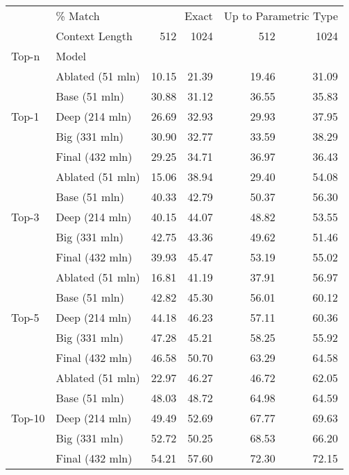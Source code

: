 \begin{tabular}{llrrrr}
\toprule
 & \% Match & \multicolumn{2}{r}{Exact} & \multicolumn{2}{r}{Up to Parametric Type} \\
 & Context Length & 512 & 1024 & 512 & 1024 \\
Top-n & Model &  &  &  &  \\
\midrule
\multirow[t]{5}{*}{Top-1} & Ablated (51 mln) & 10.15 & 21.39 & 19.46 & 31.09 \\
 & Base (51 mln) & 30.88 & 31.12 & 36.55 & 35.83 \\
 & Deep (214 mln) & 26.69 & 32.93 & 29.93 & 37.95 \\
 & Big (331 mln) & 30.90 & 32.77 & 33.59 & 38.29 \\
 & Final (432 mln) & 29.25 & 34.71 & 36.97 & 36.43 \\
\cline{1-6}
\multirow[t]{5}{*}{Top-3} & Ablated (51 mln) & 15.06 & 38.94 & 29.40 & 54.08 \\
 & Base (51 mln) & 40.33 & 42.79 & 50.37 & 56.30 \\
 & Deep (214 mln) & 40.15 & 44.07 & 48.82 & 53.55 \\
 & Big (331 mln) & 42.75 & 43.36 & 49.62 & 51.46 \\
 & Final (432 mln) & 39.93 & 45.47 & 53.19 & 55.02 \\
\cline{1-6}
\multirow[t]{5}{*}{Top-5} & Ablated (51 mln) & 16.81 & 41.19 & 37.91 & 56.97 \\
 & Base (51 mln) & 42.82 & 45.30 & 56.01 & 60.12 \\
 & Deep (214 mln) & 44.18 & 46.23 & 57.11 & 60.36 \\
 & Big (331 mln) & 47.28 & 45.21 & 58.25 & 55.92 \\
 & Final (432 mln) & 46.58 & 50.70 & 63.29 & 64.58 \\
\cline{1-6}
\multirow[t]{5}{*}{Top-10} & Ablated (51 mln) & 22.97 & 46.27 & 46.72 & 62.05 \\
 & Base (51 mln) & 48.03 & 48.72 & 64.98 & 64.59 \\
 & Deep (214 mln) & 49.49 & 52.69 & 67.77 & 69.63 \\
 & Big (331 mln) & 52.72 & 50.25 & 68.53 & 66.20 \\
 & Final (432 mln) & 54.21 & 57.60 & 72.30 & 72.15 \\
\cline{1-6}
\bottomrule
\end{tabular}

